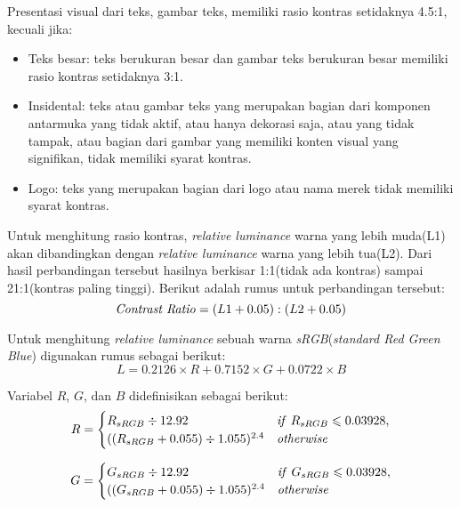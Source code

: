 Presentasi visual dari teks, gambar teks, memiliki rasio kontras setidaknya 4.5:1, kecuali jika:

\begin{itemize}
	\item Teks besar: teks berukuran besar dan gambar teks berukuran besar memiliki rasio kontras setidaknya 3:1.
	\item Insidental: teks atau gambar teks yang merupakan bagian dari komponen antarmuka yang tidak aktif, atau hanya dekorasi saja, atau yang tidak tampak, atau bagian dari gambar yang memiliki konten visual yang signifikan, tidak memiliki syarat kontras.
	\item Logo: teks yang merupakan bagian dari logo atau nama merek tidak memiliki syarat kontras.
\end{itemize}

Untuk menghitung rasio kontras, \textit{relative luminance} warna yang lebih muda(L1) akan dibandingkan dengan \textit{relative luminance} warna yang lebih tua(L2). Dari hasil perbandingan tersebut hasilnya berkisar 1:1(tidak ada kontras) sampai 21:1(kontras paling tinggi). Berikut adalah rumus untuk perbandingan tersebut:
\begin{equation}
\text{\textit{Contrast Ratio}} = (L1 + 0.05) : (L2 +0.05)
\end{equation}

Untuk menghitung \textit{relative luminance} sebuah warna \textit{sRGB}(\textit{standard Red Green Blue}) digunakan rumus sebagai berikut:
\begin{equation}
L = 0.2126 \times R + 0.7152 \times G + 0.0722 \times B
\end{equation}

Variabel $R$, $G$, dan $B$ didefinisikan sebagai berikut:
\begin{equation}
R = \begin{cases}
R_{sRGB}\div 12.92 & \text{\textit{if} $R_{sRGB} \leqslant 0.03928$}, \\
((R_{sRGB} + 0.055)\div 1.055)^{2.4} & \text{\textit{otherwise}}
\end{cases}
\end{equation}

\begin{equation}
G = \begin{cases}
G_{sRGB}\div 12.92 & \text{\textit{if} $G_{sRGB} \leqslant 0.03928$}, \\
((G_{sRGB} + 0.055)\div 1.055)^{2.4} & \text{\textit{otherwise}}
\end{cases}
\end{equation}

